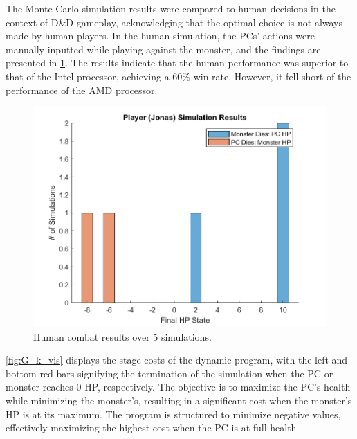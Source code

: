 \documentclass[letterpaper, 10 pt, conference]{ieeeconf}
\begin{document}
The Monte Carlo simulation results were compared to human decisions in the context of D\&D gameplay, acknowledging that the optimal choice is 
not always made by human players. 
In the human simulation, the PCs' actions were manually inputted while playing against the monster, and the findings are presented in \cref{fig:dnd_player_hist}. 
The results indicate that the human performance was superior to that of the Intel processor, achieving a 60\% win-rate. 
However, it fell short of the performance of the AMD processor.

\begin{figure}[thb]
    \centering
    \includegraphics[scale = 0.5]{figs/DND_player_jonas_hist.png}
    \caption{Human combat results over 5 simulations.}
    \label{fig:dnd_player_hist}
\end{figure}


\cref{fig:G_k_vis} displays the stage costs of the dynamic program, with the left and bottom red bars signifying the termination of the simulation when the PC or monster reaches 0 HP, respectively. The objective is to maximize the PC's health while minimizing the monster's, resulting in a significant cost when the monster's HP is at its maximum. 
The program is structured to minimize negative values, effectively maximizing the highest cost when the PC is at full health.
\end{document}
